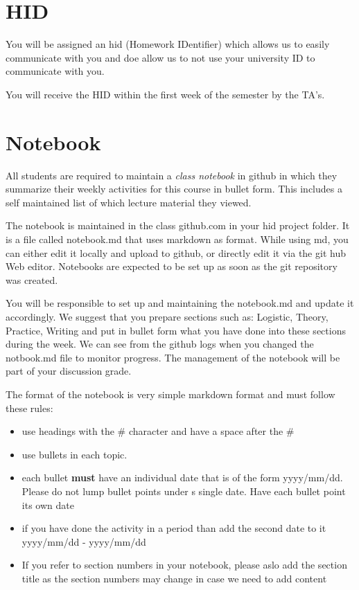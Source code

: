 \section{HID}

You will be assigned an hid (Homework IDentifier) which allows us to
easily communicate with you and doe allow us to not use your
university ID to communicate with you. 

You will receive the HID within the first week of the semester by the
TA's.

\section{Notebook}\label{notebook}

All students are required to maintain a \emph{class notebook} in
github in which they summarize their weekly activities for this course
in bullet form. This includes a self maintained list of which lecture
material they viewed.

The notebook is maintained in the class github.com in your hid project
folder. It is a file called notebook.md that uses markdown as format.
While using md, you can either edit it locally and upload to github, or
directly edit it via the git hub Web editor. Notebooks are expected to
be set up as soon as the git repository was created.

You will be responsible to set up and maintaining the notebook.md and
update it accordingly. We suggest that you prepare sections such as:
Logistic, Theory, Practice, Writing and put in bullet form what you have
done into these sections during the week. We can see from the github
logs when you changed the notbook.md file to monitor progress. The
management of the notebook will be part of your discussion grade.

The format of the notebook is very simple markdown format and must
follow these rules:

\begin{itemize}
\item use headings with the \# character and have a space after the \#
\item use bullets in each topic.
\item each bullet \textbf{must} have an individual date that is of the
  form yyyy/mm/dd. Please do not lump bullet points under s single
  date. Have each bullet point its own date
\item if you have done the activity in a period than add the second
  date to it yyyy/mm/dd - yyyy/mm/dd
\item If you refer to section numbers in your notebook, please aslo
  add the section title as the section numbers may change in case we
  need to add content
\end{itemize}


